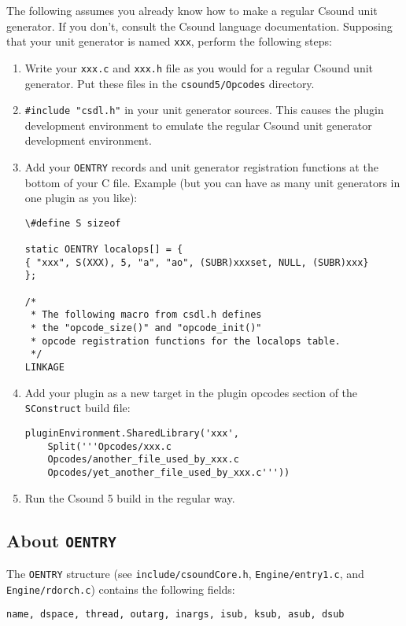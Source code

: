 \documentclass[10pt,letterpaper,onecolumn]{book}
\begin{document}
The following assumes you already know how to make a regular Csound unit generator. If you don't, consult the Csound language documentation.
Supposing that your unit generator is named \texttt{xxx}, perform the following steps:
\begin{enumerate}
\item Write your \texttt{xxx.c} and \texttt{xxx.h} file as you would for a regular Csound unit generator. Put these files in the \texttt{csound5/Opcodes} directory.
\item \texttt{\#include "csdl.h"} in your unit generator sources. This causes the plugin development environment to emulate the regular Csound unit generator development environment.
\item Add your \texttt{OENTRY} records and unit generator registration functions at the bottom of your C file. Example (but you can have as many unit generators in one plugin as you like):
\begin{lstlisting}
\#define S sizeof

static OENTRY localops[] = {
{ "xxx", S(XXX), 5, "a", "ao", (SUBR)xxxset, NULL, (SUBR)xxx}
};

/*
 * The following macro from csdl.h defines 
 * the "opcode_size()" and "opcode_init()" 
 * opcode registration functions for the localops table.
 */
LINKAGE
\end{lstlisting}
\item Add your plugin as a new target in the plugin opcodes section of the \texttt{SConstruct} build file:
\begin{lstlisting}
pluginEnvironment.SharedLibrary('xxx', 
    Split('''Opcodes/xxx.c 
    Opcodes/another_file_used_by_xxx.c 
    Opcodes/yet_another_file_used_by_xxx.c'''))
\end{lstlisting}
\item Run the Csound 5 build in the regular way.
\end{enumerate}		

\subsection{About \texttt{OENTRY}}

The \texttt{OENTRY} structure (see \texttt{include/csoundCore.h}, \texttt{Engine/entry1.c}, and \texttt{Engine/rdorch.c}) contains the following fields:

\begin{lstlisting}
name, dspace, thread, outarg, inargs, isub, ksub, asub, dsub
\end{lstlisting}
\end{document}
